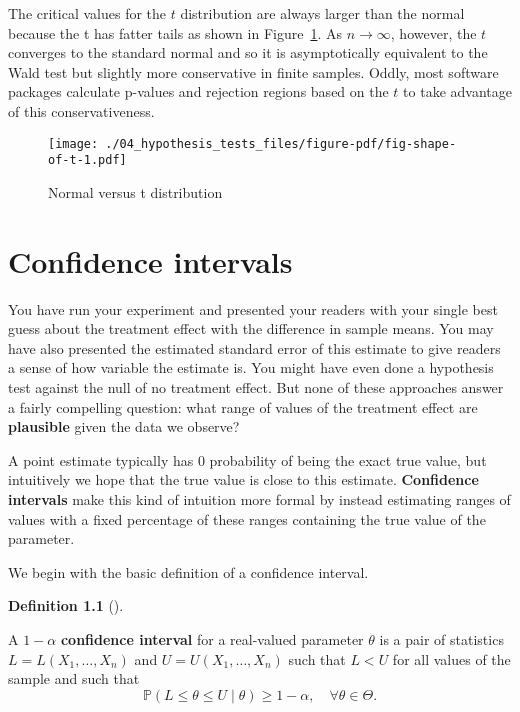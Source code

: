 \documentclass[
  letterpaper,
  DIV=11,
  numbers=noendperiod]{scrreprt}
\renewcommand{\P}{\mathbb{P}}
\theoremstyle{definition}
\newtheorem{definition}{Definition}[chapter]
\theoremstyle{plain}
\theoremstyle{definition}
\theoremstyle{remark}
\begin{document}
The critical values for the \(t\) distribution are always larger than
the normal because the t has fatter tails as shown in
Figure~\ref{fig-shape-of-t}. As \(n\to\infty\), however, the \(t\)
converges to the standard normal and so it is asymptotically equivalent
to the Wald test but slightly more conservative in finite samples.
Oddly, most software packages calculate p-values and rejection regions
based on the \(t\) to take advantage of this conservativeness.

\begin{figure}

{\centering \texttt{[image: ./04\_hypothesis\_tests\_files/figure-pdf/fig-shape-of-t-1.pdf]}

}

\caption{\label{fig-shape-of-t}Normal versus t distribution}

\end{figure}


\hypertarget{confidence-intervals}{%
\chapter{Confidence intervals}\label{confidence-intervals}}

You have run your experiment and presented your readers with your single
best guess about the treatment effect with the difference in sample
means. You may have also presented the estimated standard error of this
estimate to give readers a sense of how variable the estimate is. You
might have even done a hypothesis test against the null of no treatment
effect. But none of these approaches answer a fairly compelling
question: what range of values of the treatment effect are
\textbf{plausible} given the data we observe?

A point estimate typically has 0 probability of being the exact true
value, but intuitively we hope that the true value is close to this
estimate. \textbf{Confidence intervals} make this kind of intuition more
formal by instead estimating ranges of values with a fixed percentage of
these ranges containing the true value of the parameter.

We begin with the basic definition of a confidence interval.

\leavevmode{}%
\begin{definition}[]\label{def-coverage}

A \(1-\alpha\) \textbf{confidence interval} for a real-valued parameter
\(\theta\) is a pair of statistics \(L= L(X_1, \ldots, X_n)\) and
\(U = U(X_1, \ldots, X_n)\) such that \(L < U\) for all values of the
sample and such that \[ 
\P(L \leq \theta \leq U \mid \theta) \geq 1-\alpha, \quad \forall \theta \in \Theta.
\]

\end{definition}
\end{document}
